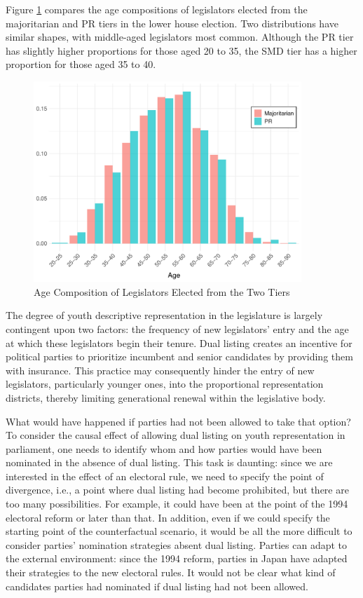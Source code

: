 \documentclass[a4paper, 11pt]{article}
\begin{document}
Figure \ref{fig:pr_vs_smd} compares the age compositions of legislators elected from the majoritarian and PR tiers in the lower house election. Two distributions have similar shapes, with middle-aged legislators most common. Although the PR tier has slightly higher proportions for those aged 20 to 35, the SMD tier has a higher proportion for those aged 35 to 40. 

\begin{figure}[!htbp]
	\includegraphics[width = 0.9\textwidth]{../figure/paper/age_smd_vs_pr_winners.pdf}
	\caption{Age Composition of Legislators Elected from the Two Tiers}
	\label{fig:pr_vs_smd}
\end{figure}

The degree of youth descriptive representation in the legislature is largely contingent upon two factors: the frequency of new legislators' entry and the age at which these legislators begin their tenure. Dual listing creates an incentive for political parties to prioritize incumbent and senior candidates by providing them with insurance. This practice may consequently hinder the entry of new legislators, particularly younger ones, into the proportional representation districts, thereby limiting generational renewal within the legislative body.

What would have happened if parties had not been allowed to take that option? To consider the causal effect of allowing dual listing on youth representation in parliament, one needs to identify whom and how parties would have been nominated in the absence of dual listing. This task is daunting: since we are interested in the effect of an electoral rule, we need to specify the point of divergence, i.e., a point where dual listing had become prohibited, but there are too many possibilities. For example, it could have been at the point of the 1994 electoral reform or later than that. In addition, even if we could specify the starting point of the counterfactual scenario, it would be all the more difficult to consider parties' nomination strategies absent dual listing. Parties can adapt to the external environment: since the 1994 reform, parties in Japan have adapted their strategies to the new electoral rules. It would not be clear what kind of candidates parties had nominated if dual listing had not been allowed. 
\end{document}
